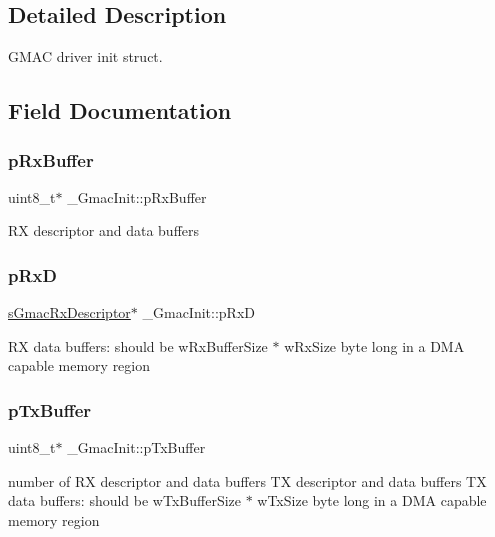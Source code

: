 \subsection{Detailed Description}
G\+M\+AC driver init struct. 

\subsection{Field Documentation}
\mbox{\label{struct__GmacInit_ac60bbc0d4b39b341f6075974f26a40d3}} 
\subsubsection{\texorpdfstring{pRxBuffer}{pRxBuffer}}
{\footnotesize\ttfamily uint8\+\_\+t$\ast$ \+\_\+\+Gmac\+Init\+::p\+Rx\+Buffer}

RX descriptor and data buffers \mbox{\label{struct__GmacInit_a2ad61f67d7627343c06d5c8ef61952a9}} 
\subsubsection{\texorpdfstring{pRxD}{pRxD}}
{\footnotesize\ttfamily \mbox{\hyperlink{group__gmac__structs_ga60c9fd1b0bff688c6e72c825d088a50b}{s\+Gmac\+Rx\+Descriptor}}$\ast$ \+\_\+\+Gmac\+Init\+::p\+RxD}

RX data buffers\+: should be w\+Rx\+Buffer\+Size $\ast$ w\+Rx\+Size byte long in a D\+MA capable memory region \mbox{\label{struct__GmacInit_afb6dc9cd22e214ca94fb8d4bc5a5977b}} 
\subsubsection{\texorpdfstring{pTxBuffer}{pTxBuffer}}
{\footnotesize\ttfamily uint8\+\_\+t$\ast$ \+\_\+\+Gmac\+Init\+::p\+Tx\+Buffer}

number of RX descriptor and data buffers TX descriptor and data buffers TX data buffers\+: should be w\+Tx\+Buffer\+Size $\ast$ w\+Tx\+Size byte long in a D\+MA capable memory region \mbox{\label{struct__GmacInit_ab0a287b2826177f18e0926dc29740db3}} 
